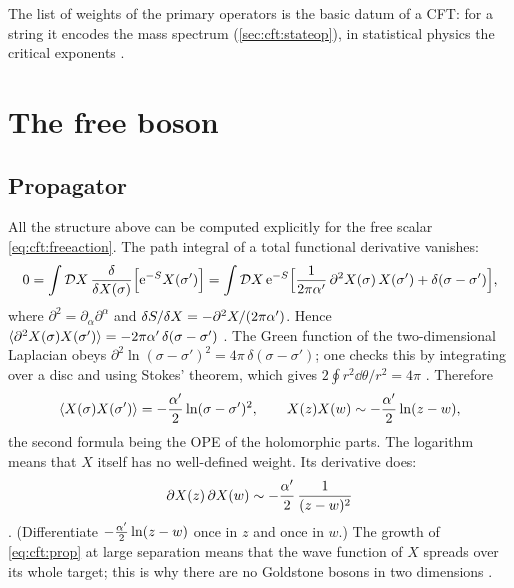 The list of weights of the primary operators is the basic datum of a CFT: for a string it
encodes the mass spectrum (\cref{sec:cft:stateop}), in statistical physics the critical
exponents .

\section{The free boson}\label{sec:cft:boson}

\subsection{Propagator}

All the structure above can be computed explicitly for the free scalar
\eqref{eq:cft:freeaction}. The path integral of a total functional derivative vanishes:
\begin{equation*}
  0=\int\mathcal DX\,\frac{\delta}{\delta X(\sigma)}\Big[\mathrm{e}^{-S}X(\sigma')\Big]
   =\int\mathcal DX\,\mathrm{e}^{-S}\Big[\frac{1}{2\pi\alpha'}\,\partial^2X(\sigma)\,X(\sigma')
   +\delta(\sigma-\sigma')\Big],
\end{equation*}
where $\partial^2=\partial_\alpha\partial^\alpha$ and $\delta S/\delta X=-\partial^2X/(2\pi\alpha')$.
Hence $\langle \partial^2X(\sigma)X(\sigma')\rangle=-2\pi\alpha'\,\delta(\sigma-\sigma')$
. The Green function of the two-dimensional Laplacian obeys
$\partial^2\ln(\sigma-\sigma')^2=4\pi\,\delta(\sigma-\sigma')$; one checks this by integrating
over a disc and using Stokes' theorem, which gives $2\oint r^2\dd\theta/r^2=4\pi$
. Therefore
\begin{equation}\label{eq:cft:prop}
  \langle X(\sigma)X(\sigma')\rangle=-\frac{\alpha'}{2}\ln(\sigma-\sigma')^2 ,\qquad
  X(z)X(w)\sim-\frac{\alpha'}{2}\ln(z-w),
\end{equation}
the second formula being the OPE of the holomorphic parts. The logarithm means that $X$ itself
has no well-defined weight. Its derivative does:
\begin{equation}\label{eq:cft:dXdX}
  \partial X(z)\,\partial X(w)\sim-\frac{\alpha'}{2}\,\frac{1}{(z-w)^2}
\end{equation}
. (Differentiate $-\frac{\alpha'}2\ln(z-w)$ once in $z$ and once
in $w$.) The growth of \eqref{eq:cft:prop} at large separation means that the wave function of $X$
spreads over its whole target; this is why there are no Goldstone bosons in two dimensions
.


